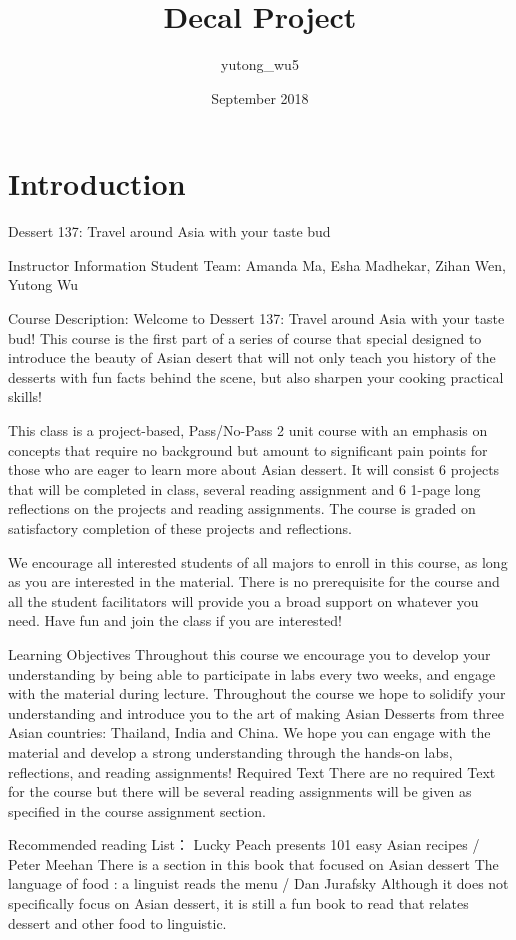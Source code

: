 \documentclass{article}
\title{Decal Project}
\author{yutong_wu5 }
\date{September 2018}
\begin{document}
\maketitle

\section{Introduction}

Dessert 137: Travel around Asia with your taste bud 

Instructor Information
Student Team: Amanda Ma, Esha Madhekar, Zihan Wen, Yutong Wu

Course Description:
Welcome to Dessert 137: Travel around Asia with your taste bud! This course is the first part of a series of course that special designed to introduce the beauty of Asian desert that will not only teach you history of the desserts with fun facts behind the scene, but also sharpen your cooking practical skills!

This class is a project-based, Pass/No-Pass 2 unit course with an emphasis on concepts that require no background but amount to significant pain points for those who are eager to learn more about Asian dessert. It will consist 6 projects that will be completed in class, several reading assignment and 6 1-page long reflections on the projects and reading assignments. The course is graded on satisfactory completion of these projects and reflections.

We encourage all interested students of all majors to enroll in this course, as long as you are interested in the material. There is no prerequisite for the course and all the student facilitators will provide you a broad support on whatever you need. Have fun and join the class if you are interested!

Learning Objectives
Throughout this course we encourage you to develop your understanding by being able to participate in labs every two weeks, and engage with the material during lecture. Throughout the course we hope to solidify your understanding and introduce you to the art of making Asian Desserts from three Asian countries: Thailand, India and China. We hope you can engage with the material and develop a strong understanding through the hands-on labs, reflections, and reading assignments!
Required Text
There are no required Text for the course but there will be several reading assignments will be given as specified in the course assignment section. 

Recommended reading List：
Lucky Peach presents 101 easy Asian recipes / Peter Meehan 
There is a section in this book that focused on Asian dessert
The language of food : a linguist reads the menu / Dan Jurafsky
Although it does not specifically focus on Asian dessert, it is still a fun book to read that relates dessert and other food to linguistic.
\end{document}
